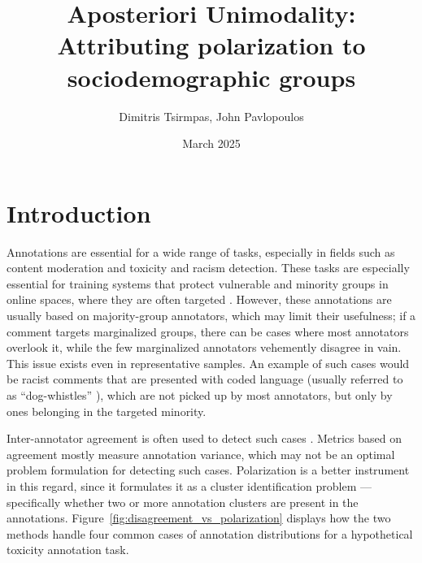 \documentclass[twocolumn, 8pt]{article}
\title{Aposteriori Unimodality: Attributing polarization to sociodemographic groups}
\author{Dimitris Tsirmpas, John Pavlopoulos}
\date{March 2025}
\begin{document}
\maketitle


\section{Introduction}

Annotations are essential for a wide range of tasks, especially in fields such as content moderation and toxicity and racism detection. These tasks are especially essential for training systems that protect vulnerable and minority groups in online spaces, where they are often targeted \parencite{un_hate_speech_targets, ucdavis_hate_speech}. However, these annotations are usually based on majority-group annotators, which may limit their usefulness; if a comment targets marginalized groups, there can be cases where most annotators overlook it, while the few marginalized annotators vehemently disagree in vain. This issue exists even in representative samples. An example of such cases would be racist comments that are presented with coded language (usually referred to as ``dog-whistles'' \parencite{quaranto2022dog}), which are not picked up by most annotators, but only by ones belonging in the targeted minority. %

Inter-annotator agreement is often used to detect such cases \parencite{petra_2022_handling}. Metrics based on agreement  mostly measure annotation variance, which may not be an optimal problem formulation for detecting such cases. Polarization is a better instrument in this regard, since it formulates it as a cluster identification problem\parencite{Pavlopoulos2023, pavlopoulos-likas-2024} ---specifically whether two or more annotation clusters are present in the annotations. Figure~\ref{fig:disagreement_vs_polarization} displays how the two methods handle four common cases of annotation distributions for a hypothetical toxicity annotation task.
\end{document}
